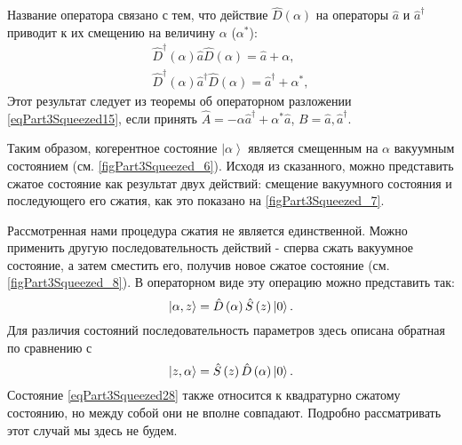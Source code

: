 Название оператора связано с тем, что действие
$\hat{D}\left(\alpha\right)$ на операторы $\hat{a}$ и $\hat{a}^{\dag}$
приводит к их смещению на величину $\alpha$ ($\alpha^{*}$):
\begin{eqnarray}
\hat{D}^{\dag}\left(\alpha\right)\hat{a}\hat{D}\left(\alpha\right) =
\hat{a} + \alpha,
\nonumber \\
\hat{D}^{\dag}\left(\alpha\right)\hat{a}^{\dag}\hat{D}\left(\alpha\right) =
\hat{a}^{\dag} + \alpha^{*},
\label{eqPart3SqueezedTaskOffset}
\end{eqnarray}
Этот результат следует из теоремы об операторном разложении
\eqref{eqPart3Squeezed15}, если принять $\hat{A} = - \alpha \hat{a}^{\dag}
+ \alpha^{*} \hat{a}$, $B=\hat{a}, \hat{a}^{\dag}$.



Таким образом, когерентное состояние $\left|\alpha\right>$ является
смещенным на $\alpha$ вакуумным состоянием
(см. \autoref{figPart3Squeezed_6}).
Исходя из сказанного, можно представить сжатое
состояние как результат двух действий: смещение вакуумного состояния и
последующего его сжатия, как это показано на
\autoref{figPart3Squeezed_7}. 




Рассмотренная нами процедура сжатия не является единственной. Можно
применить другую последовательность действий - сперва сжать вакуумное
состояние, а затем сместить его, получив новое сжатое состояние
(см. \autoref{figPart3Squeezed_8}). В операторном виде эту операцию
можно представить так:
\begin{equation}
\left|\alpha, z\right> =
\hat{D}\left(\alpha\right)\hat{S}\left(z\right) \ket{0}.
\label{eqPart3Squeezed28}
\end{equation}
Для различия состояний последовательность параметров здесь описана
обратная по сравнению с 
\[
\left|z,\alpha\right> =
\hat{S}\left(z\right) \hat{D}\left(\alpha\right)\ket{0}.
\]
Состояние \eqref{eqPart3Squeezed28} также относится к квадратурно
сжатому состоянию, но между собой они не вполне совпадают. Подробно
рассматривать этот случай мы здесь не будем.



